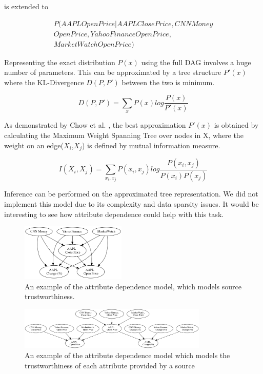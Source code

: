 \documentclass{acm_proc_article-sp}
\begin{document}
is extended to 

\begin{align}
P(AAPL Open Price|AAPL Close Price, CNN Money \nonumber  
\\Open Price,Yahoo Finance Open Price, \nonumber  
\\Market Watch Open Price) 
\end{align}

Representing the exact distribution $P(x)$ using the full DAG involves a huge number of parameters. This can be approximated by a tree structure $P'(x)$ where the KL-Divergence $D(P,P')$ between the two is minimum.  

\begin{equation}
D(P,P') = \sum_x P(x) log \frac{P(x)}{P'(x)}
\end{equation}

As demonstrated by Chow et al. \cite{chow1968approximating}, the best approximation $P'(x)$ is obtained by calculating the Maximum Weight Spanning Tree over nodes in X, where the weight on an edge($X_i$,$X_j$) is  defined by mutual information measure. 

\begin{equation}
I(X_i,X_j) = \sum_{x_i,x_j} P(x_i,x_j) log\frac{P(x_i,x_j)}{P(x_i) P(x_j)}
\end{equation}

Inference can be performed on the approximated tree representation. We did not implement this model due to its complexity and data sparsity issues. It would be interesting to see how attribute dependence could help with this task.

\begin{figure}
\centering
\includegraphics[width=5cm]{bn1.png}
\caption{An example of the attribute dependence model, which models source trustworthiness.}
\label{fig:sourcet}
\end{figure}

\begin{figure}
\centering
\includegraphics[width=9cm]{bn2.png}
\caption{An example of the attribute dependence model which models the trustworthiness of each attribute provided by a source}
\label{fig:attrt}
\end{figure}
\end{document}
